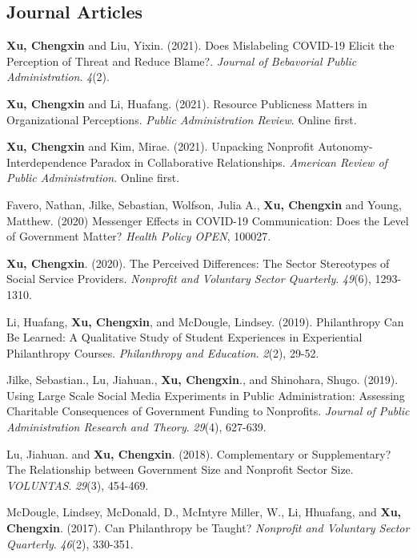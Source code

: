 \documentclass[letterpaper]{article}
\renewenvironment{itemize}{
  \begin{list}{}{
    \setlength{\leftmargin}{1.5em}
  }
}{
  \end{list}
}
\begin{document}
\subsection*{Journal Articles}

\begin{itemize}

\item \textbf{Xu, Chengxin} and Liu, Yixin. (2021). Does Mislabeling COVID-19 Elicit the Perception of Threat and Reduce Blame?.  {\it Journal of Bebavorial Public Administration}. {\it 4}(2).

\item \textbf{Xu, Chengxin} and Li, Huafang. (2021). Resource Publicness Matters in Organizational Perceptions.  {\it Public Administration Review}. Online first.

\item \textbf{Xu, Chengxin} and Kim, Mirae. (2021). Unpacking Nonprofit Autonomy-Interdependence Paradox in Collaborative Relationships. {\it American Review of Public Administration}. Online first.

\item Favero, Nathan, Jilke, Sebastian, Wolfson, Julia A., \textbf{Xu, Chengxin} and Young, Matthew. (2020) Messenger Effects in COVID-19 Communication: Does the Level of Government Matter? {\it Health Policy OPEN}, 100027. 

\item \textbf{Xu, Chengxin}. (2020). The Perceived Differences: The Sector Stereotypes of Social Service Providers. {\it Nonprofit and Voluntary Sector Quarterly}.	{\it 49}(6), 1293-1310.

\item Li, Huafang, \textbf{Xu, Chengxin}, and McDougle, Lindsey. (2019). Philanthropy Can Be Learned: A Qualitative Study of Student Experiences in Experiential Philanthropy Courses. {\it Philanthropy and Education}. {\it 2}(2), 29-52.

\item Jilke, Sebastian., Lu, Jiahuan., \textbf{Xu, Chengxin}., and Shinohara, Shugo. (2019). Using Large Scale Social Media Experiments in Public Administration: Assessing Charitable Consequences of Government Funding to Nonprofits. {\it Journal of Public Administration Research and Theory}. {\it 29}(4), 627-639.

\item Lu, Jiahuan. and \textbf{Xu, Chengxin}. (2018). Complementary or Supplementary? The Relationship between Government Size and Nonprofit Sector Size. {\it VOLUNTAS}. {\it 29}(3), 454-469.

\item McDougle, Lindsey, McDonald, D., McIntyre Miller, W., Li, Hhuafang, and \textbf{Xu, Chengxin}. (2017). Can Philanthropy be Taught? {\it Nonprofit and Voluntary Sector Quarterly}. {\it 46}(2), 330-351. 

\end{itemize}
\end{document}
